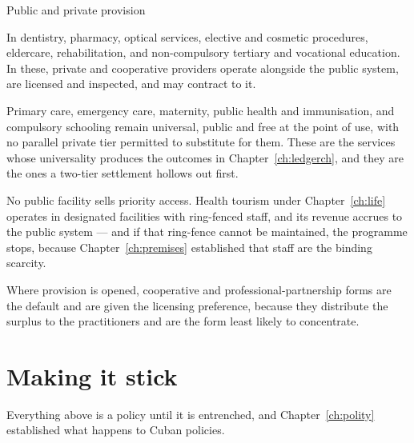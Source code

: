 \begin{design}{Public and private provision}
\label{d:delivery}
\begin{rules}
 In dentistry, pharmacy, optical services,
elective and cosmetic procedures, eldercare, rehabilitation, and non-compulsory
tertiary and vocational education. In these, private and cooperative providers
operate alongside the public system, are licensed and inspected, and may
contract to it.

 Primary care, emergency care, maternity,
public health and immunisation, and compulsory schooling remain universal,
public and free at the point of use, with no parallel private tier permitted to
substitute for them. These are the services whose universality produces the
outcomes in Chapter~\ref{ch:ledgerch}, and they are the ones a two-tier
settlement hollows out first.

 No public facility sells priority access. Health
tourism under Chapter~\ref{ch:life} operates in designated facilities with
ring-fenced staff, and its revenue accrues to the public system --- and if that
ring-fence cannot be maintained, the programme stops, because
Chapter~\ref{ch:premises} established that staff are the binding scarcity.

 Where provision is opened, cooperative and
professional-partnership forms are the default and are given the licensing
preference, because they distribute the surplus to the practitioners and are
the form least likely to concentrate.
\end{rules}
\end{design}

\section{Making it stick}

Everything above is a policy until it is entrenched, and Chapter~\ref{ch:polity}
established what happens to Cuban policies.

